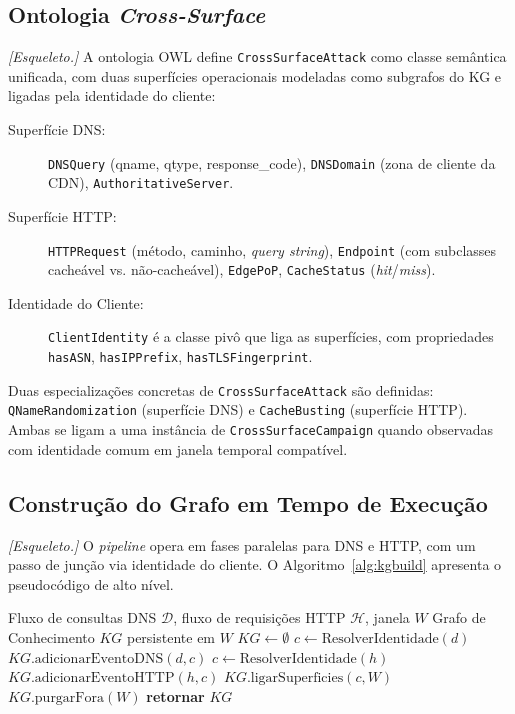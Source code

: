 \documentclass[preprint,12pt]{elsarticle}
\begin{document}
\subsection{Ontologia \emph{Cross-Surface}}

\textit{[Esqueleto.]} A ontologia OWL define \texttt{CrossSurfaceAttack} como classe semântica unificada, com duas superfícies operacionais modeladas como subgrafos do KG e ligadas pela identidade do cliente:

\begin{description}
    \item[Superfície DNS:] \texttt{DNSQuery} (qname, qtype, response\_code), \texttt{DNSDomain} (zona de cliente da CDN), \texttt{AuthoritativeServer}.
    \item[Superfície HTTP:] \texttt{HTTPRequest} (método, caminho, \emph{query string}), \texttt{Endpoint} (com subclasses cacheável vs. não-cacheável), \texttt{EdgePoP}, \texttt{CacheStatus} (\emph{hit}/\emph{miss}).
    \item[Identidade do Cliente:] \texttt{ClientIdentity} é a classe pivô que liga as superfícies, com propriedades \texttt{hasASN}, \texttt{hasIPPrefix}, \texttt{hasTLSFingerprint}.
\end{description}

Duas especializações concretas de \texttt{CrossSurfaceAttack} são definidas: \texttt{QNameRandomization} (superfície DNS) e \texttt{CacheBusting} (superfície HTTP). Ambas se ligam a uma instância de \texttt{CrossSurfaceCampaign} quando observadas com identidade comum em janela temporal compatível.

\subsection{Construção do Grafo em Tempo de Execução}

\textit{[Esqueleto.]} O \emph{pipeline} opera em fases paralelas para DNS e HTTP, com um passo de junção via identidade do cliente. O Algoritmo~\ref{alg:kgbuild} apresenta o pseudocódigo de alto nível.

\begin{algorithm}[H]
\caption{Construção do Grafo \emph{Cross-Surface} em Tempo de Execução}
\label{alg:kgbuild}
\begin{algorithmic}[1]
\REQUIRE Fluxo de consultas DNS $\mathcal{D}$, fluxo de requisições HTTP $\mathcal{H}$, janela $W$
\ENSURE Grafo de Conhecimento $KG$ persistente em $W$
\STATE $KG \leftarrow \emptyset$
    \STATE $c \leftarrow \text{ResolverIdentidade}(d)$
    \STATE $KG.\text{adicionarEventoDNS}(d, c)$
\ENDFOR
{}
    \STATE $c \leftarrow \text{ResolverIdentidade}(h)$
    \STATE $KG.\text{adicionarEventoHTTP}(h, c)$
    \STATE $KG.\text{ligarSuperficies}(c, W)$
\ENDFOR
\STATE $KG.\text{purgarFora}(W)$
\STATE \textbf{retornar} $KG$
\end{algorithmic}
\end{algorithm}
\end{document}
